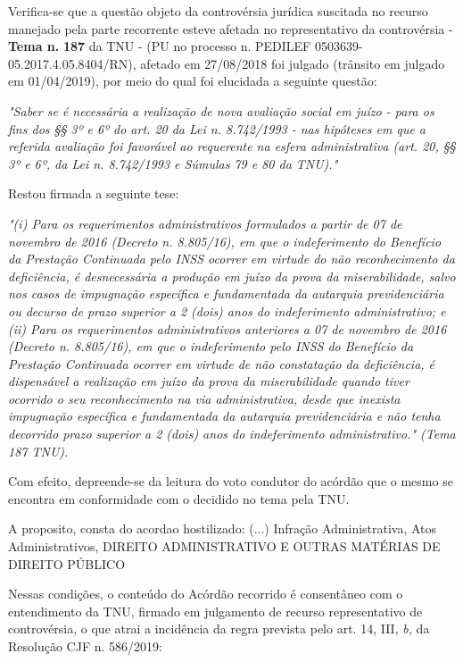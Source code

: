 \documentclass[12pt]{article}
\begin{document}
\justifying
\noindent Verifica-se que a questão objeto da controvérsia jurídica suscitada no recurso manejado pela parte recorrente esteve afetada no representativo da controvérsia - \textbf{Tema n. }\textbf{187} da TNU - (PU no processo n. PEDILEF 0503639-05.2017.4.05.8404/RN),  afetado em 27/08/2018 foi julgado (trânsito em julgado em 01/04/2019), por meio do qual foi elucidada a seguinte questão:

\noindent \textit{"Saber se é necessária a realização de nova avaliação social em juízo - para os fins dos §§ 3º e 6º do art. 20 da Lei n. 8.742/1993 - nas hipóteses em que a referida avaliação foi favorável ao requerente na esfera administrativa (art. 20, §§ 3º e 6º, da Lei n. 8.742/1993 e Súmulas 79 e 80 da TNU)."}

\noindent Restou firmada a seguinte tese:

\noindent \textit{"(i) Para os requerimentos administrativos formulados a partir de 07 de novembro de 2016 (Decreto n. 8.805/16), em que o indeferimento do Benefício da Prestação Continuada pelo INSS ocorrer em virtude do não reconhecimento da deficiência, é desnecessária a produção em juízo da prova da miserabilidade, salvo nos casos de impugnação específica e fundamentada da autarquia previdenciária ou decurso de prazo superior a 2 (dois) anos do indeferimento administrativo; e (ii) Para os requerimentos administrativos anteriores a 07 de novembro de 2016 (Decreto n. 8.805/16), em que o indeferimento pelo INSS do Benefício da Prestação Continuada ocorrer em virtude de não constatação da deficiência, é dispensável a realização em juízo da prova da miserabilidade quando tiver ocorrido o seu reconhecimento na via administrativa, desde que inexista impugnação específica e fundamentada da autarquia previdenciária e não tenha decorrido prazo superior a 2 (dois) anos do indeferimento administrativo." (Tema 187 TNU).}

\noindent Com efeito, depreende-se da leitura do voto condutor do acórdão que o mesmo se encontra em conformidade com o decidido no  tema pela TNU.

\noindent A proposito, consta do acordao hostilizado: (...) Infração Administrativa, Atos Administrativos, DIREITO ADMINISTRATIVO E OUTRAS MATÉRIAS DE DIREITO PÚBLICO

\noindent Nessas condições, o conteúdo do Acórdão recorrido é consentâneo com o entendimento da TNU, firmado em julgamento de recurso representativo de controvérsia, o que atrai a incidência da regra prevista pelo art. 14, III, \textit{b,} da Resolução CJF n. 586/2019:
\end{document}
